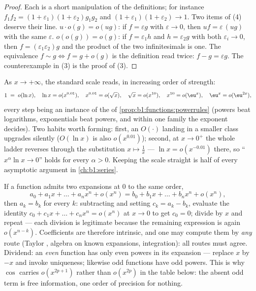 \begin{proof}
Each is a short manipulation of the definitions; for instance
$f_1 f_2 = (1+\varepsilon_1)(1+\varepsilon_2) g_1 g_2$ and $(1 +
\varepsilon_1)(1+\varepsilon_2) \to 1$. Two items of (4) deserve
their line. $u\cdot o(g) = o(ug)$: if $f = \varepsilon g$ with
$\varepsilon \to 0$, then $uf = \varepsilon\,(ug)$ with the same
$\varepsilon$. $o(o(g)) = o(g)$: if $f = \varepsilon_1 h$ and
$h = \varepsilon_2 g$ with both $\varepsilon_i \to 0$, then $f =
(\varepsilon_1\varepsilon_2) g$ and the product of the two
infinitesimals is one. The equivalence $f \sim g \iff f = g +
o(g)$ is the definition read twice: $f - g = \varepsilon g$.
The counterexample in (3) is the proof of (3).
\end{proof}

\begin{example}\label{ex:b1:taylor:scale}
As $x \to +\infty$, the standard scale reads, in increasing
order of strength:
\[
1 \;=\; o(\ln x), \quad
\ln x = o(x^{0.01}), \quad
x^{0.01} = o(\sqrt x), \quad
\sqrt x = o(x^{10}), \quad
x^{10} = o(\eu^{x}), \quad
\eu^x = o(\eu^{2x}) ,
\]
every step being an instance of the  of
\cref{prop:b1:functions:powerrules} (powers beat logarithms,
exponentials beat powers, and within one family the exponent
decides). Two habits worth forming: first, an $O(\cdot)$ landing
in a smaller class upgrades silently ($O(\ln x)$ is also
$o(x^{0.01})$); second, at $x \to 0^+$ the whole ladder
reverses through the substitution $x \mapsto \frac1x$ ---
$\ln x = o(x^{-0.01})$ there, so ``$x^\alpha \ln x \to 0$''
holds for every $\alpha > 0$. Keeping the scale straight is
half of every asymptotic argument in
\cref{ch:b1:series}.
\end{example}

\begin{example}\label{ex:b1:taylor:uniqueness}
If a function admits two expansions at $0$ to the same order,
\[
a_0 + a_1 x + \dots + a_n x^n + o(x^n)
= b_0 + b_1 x + \dots + b_n x^n + o(x^n),
\]
then $a_k = b_k$ for every $k$: subtracting and setting $c_k =
a_k - b_k$, evaluate the identity $c_0 + c_1 x + \dots + c_n x^n
= o(x^n)$ at $x \to 0$ to get $c_0 = 0$; divide by $x$ and
repeat --- each division is legitimate because the remaining
expression is again $o(x^{n-k})$. Coefficients are therefore
intrinsic, and one may compute them by \emph{any} route (Taylor
, algebra on known expansions, integration): all
routes must agree. Dividend: an \emph{even} function has only
even powers in its expansion --- replace $x$ by $-x$ and invoke
uniqueness; likewise odd functions have odd powers. This is why
$\cos$ carries $o(x^{2p+1})$ rather than $o(x^{2p})$ in the
table below: the absent odd term is free information, one order
of precision for nothing.
\end{example}

